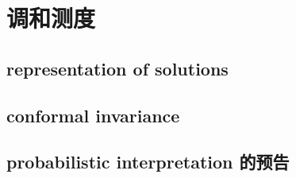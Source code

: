 \section{调和测度}
\label{b3:sec:1604}


\subsection{representation of solutions}
\label{b3:subsec:160401}

\subsection{conformal invariance}
\label{b3:subsec:160402}

\subsection{probabilistic interpretation 的预告}
\label{b3:subsec:160403}


